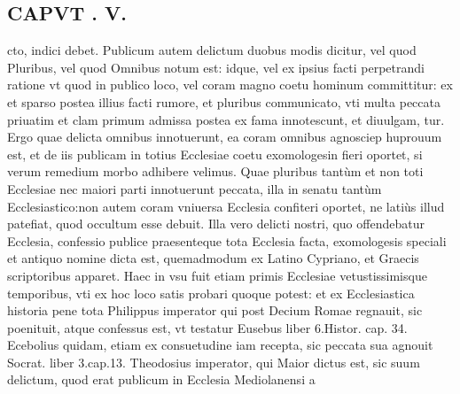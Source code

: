 \documentclass{article}
\begin{document}
\begin{pages}
\section*{CAPVT . V. }
\marginpar{[ p.524 ]}\pstart cto, indici debet. Publicum autem delictum duobus modis dicitur, vel quod Pluribus, vel quod Omnibus notum est: idque, vel ex ipsius facti perpetrandi ratione vt quod in publico loco, vel coram magno coetu hominum committitur: ex et sparso postea illius facti rumore, et pluribus communicato, vti multa peccata priuatim et clam primum admissa postea ex fama innotescunt, et diuulgam, tur. Ergo quae delicta omnibus innotuerunt, ea coram omnibus agnosciep huprouum est, et de iis publicam in totius Ecclesiae coetu exomologesin fieri oportet, si verum remedium morbo adhibere velimus.  \pend\pstart Quae pluribus tantùm et non toti Ecclesiae nec maiori parti innotuerunt peccata, illa in senatu tantùm Ecclesiastico:non autem coram vniuersa Ecclesia confiteri oportet, ne latiùs illud patefiat, quod occultum esse debuit.  \pend\pstart Illa vero delicti nostri, quo offendebatur Ecclesia, confessio publice praesenteque tota Ecclesia facta, exomologesis speciali et antiquo nomine dicta est, quemadmodum ex Latino Cypriano, et Graecis scriptoribus apparet.  \pend\pstart Haec in vsu fuit etiam primis Ecclesiae vetustissimisque  temporibus, vti ex hoc loco satis probari quoque  potest: et ex Ecclesiastica historia pene tota Philippus imperator qui post Decium Romae regnauit, sic poenituit, atque  confessus est, vt testatur Eusebus liber 6.Histor. cap. 34. Ecebolius quidam, etiam ex consuetudine iam recepta, sic peccata sua agnouit Socrat. liber 3.cap.13. Theodosius imperator, qui Maior dictus est, sic suum delictum, quod erat publicum in Ecclesia Mediolanensi a\pend

\end{pages}
\end{document}
